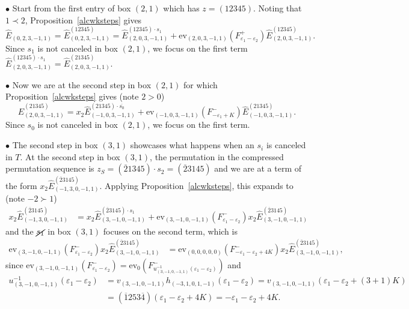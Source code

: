 \documentclass[11pt]{article}
\theoremstyle{plain}
\theoremstyle{definition}
\newenvironment{example}
  {\pushQED{\qed}\exampleinner}
  {\popQED\endexampleinner}
\theoremstyle{remark}
\numberwithin{equation}{section}
\def\ev{\mathrm{ev}}
\newcounter{r}
\newcounter{s}
\begin{document}
\begin{example}
\noindent
$\bullet$ Start from the first entry of box $(2,1)$ which has $z=(12345)$.
Noting that $1\prec 2$, Proposition~\ref{alcwksteps} gives
$$\widehat{E}_{(0,2,3,-1,1)} = \widehat{E}^{(12345)}_{(0,2,3,-1,1)}
=\widehat{E}^{(12345)\cdot s_1}_{(2,0,3,-1,1)} 
+ \ev_{(2,0,3,-1,1)}(F^+_{\varepsilon_1-\varepsilon_2})\widehat{E}^{(12345)}_{(2,0,3,-1,1)}. 
$$
Since $s_1$ is not canceled in box $(2,1)$, we focus on the first term 
$\widehat{E}^{(12345)\cdot s_1}_{(2,0,3,-1,1)}=\widehat{E}^{(21345)}_{(2,0,3,-1,1)}$.

\noindent
$\bullet$  Now we are at the second step in box $(2,1)$ for which Proposition~\ref{alcwksteps} gives (note $2>0$)
$$\widehat{E}^{(21345)}_{(2,0,3,-1,1)}  = 
x_2\widehat{E}^{(21345)\cdot \overline{s_0}}_{(-1,0,3,-1,1)}
+\ev_{(-1,0,3,-1,1)}(F^-_{-\varepsilon_1+K})\widehat{E}^{(21345)}_{(-1,0,3,-1,1)}.
$$
Since $s_0$ is not canceled in box $(2,1)$, we focus on the first term. 


\noindent
$\bullet$ The second step in box $(3,1)$ showcases what happens when an $s_i$ is canceled in $T$. 
At the second step in box $(3,1)$, the permutation in the compressed permutation sequence is $z_S =  (\overline{2}1345)\cdot s_2
=(\overline{2}3145)$ and we are at a term of the form
$x_2\widehat{E}^{(\overline{2}3145)}_{(-1,3,0,-1,1)}$. 
Applying Proposition~\ref{alcwksteps}, this expands to (note $-2\succ 1$)
\begin{align*}
x_2\widehat{E}^{(\overline{2}3145)}_{(-1,3,0,-1,1)}
&=x_2\widehat{E}^{(\overline{2}3145)\cdot s_1}_{(3,-1,0,-1,1)}
+\ev_{(3,-1,0,-1,1)}(F^-_{\varepsilon_1-\varepsilon_2}) x_2\widehat{E}^{(\overline{2}3145)}_{(3,-1,0,-1,1)}
\end{align*}
and the $\cancel{s_1}$ in box $(3,1)$ focuses on the second term, which is
\begin{align*}
\ev_{(3,-1,0,-1,1)}(F^-_{\varepsilon_1-\varepsilon_2}) x_2\widehat{E}^{(\overline{2}3145)}_{(3,-1,0,-1,1)}
&=
\ev_{(0,0,0,0,0)}(F^-_{-\varepsilon_1-\varepsilon_2+4K}) x_2\widehat{E}^{(\overline{2}3145)}_{(3,-1,0,-1,1)},
\end{align*}
since
$\ev_{(3,-1,0,-1,1)}(F^-_{\varepsilon_1-\varepsilon_2})
=\ev_0(F^-_{u_{(3,-1,0,-1,1)}^{-1}(\varepsilon_1-\varepsilon_2)})$
and
\begin{align*}
u_{(3,-1,0,-1,1)}^{-1}(\varepsilon_1-\varepsilon_2)
&=v_{(3,-1,0,-1,1)}h_{(-3,1,0,1,-1)}(\varepsilon_1-\varepsilon_2)
=v_{(3,-1,0,-1,1)}(\varepsilon_1-\varepsilon_2+(3+1)K)
\\
&=(\overline{1}253\overline{4})(\varepsilon_1-\varepsilon_2+4K)
=-\varepsilon_1-\varepsilon_2+4K.
\end{align*}



\end{example}
\end{document}
